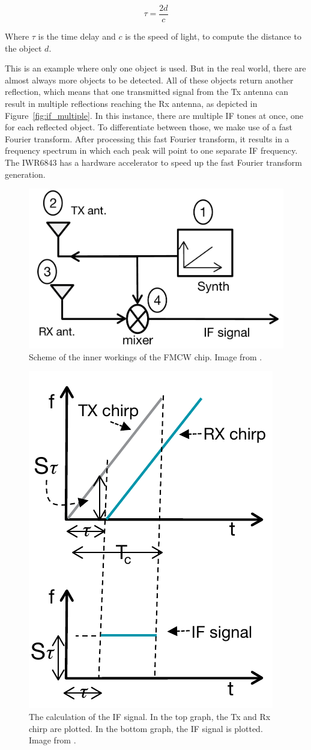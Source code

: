 \begin{equation}
\tau = \frac{2d}{c}
\label{eq:range_equation}
\end{equation}

Where $\tau$ is the time delay and $c$ is the speed of light, to compute the distance to the object $d$. 

This is an example where only one object is used. But in the real world, there are almost always more objects to be detected. All of these objects return another reflection, which means that one transmitted signal from the Tx antenna can result in multiple reflections reaching the Rx antenna, as depicted in Figure~\ref{fig:if_multiple}. In this instance, there are multiple IF tones at once, one for each reflected object. To differentiate between those, we make use of a fast Fourier transform. After processing this fast Fourier transform, it results in a frequency spectrum in which each peak will point to one separate IF frequency. The IWR6843 has a hardware accelerator to speed up the fast Fourier transform generation.


\begin{figure}[t]
\centering
\includegraphics[width=.5\textwidth]{figures/background/fmcw_internals.png}
\caption{Scheme of the inner workings of the FMCW chip. Image from \cite{mmwave_fundamentals_website}.}
\label{fig:fmcw_inner}
\end{figure}

\begin{figure}[t]
\centering
\includegraphics[width=.5\textwidth]{figures/background/if_signal.png}
\caption{The calculation of the IF signal. In the top graph, the Tx and Rx chirp are plotted. In the bottom graph, the IF signal is plotted. Image from \cite{mmwave_fundamentals_website}.}
\label{fig:if_signal}
\end{figure}

